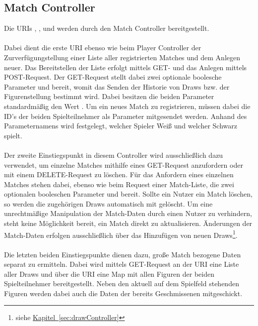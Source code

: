 \subsection{Match Controller}\label{sec:matchController}
Die \glspl{URI} , ,  und  werden durch den Match Controller bereitgestellt.\\
\\
Dabei dient die erste \gls{URI} ebenso wie beim Player Controller der Zurverfügungstellung einer Liste aller registrierten Matches und dem Anlegen neuer. Das Bereitstellen der Liste erfolgt mittels GET- und das Anlegen mittels POST-Request. Der GET-Request stellt dabei zwei optionale boolesche Parameter  und  bereit, womit das Senden der Historie von Draws bzw. der Figurenstellung bestimmt wird. Dabei besitzen die beiden Parameter standardmäßig den Wert . Um ein neues Match zu registrieren, müssen dabei die ID's der beiden Spielteilnehmer als Parameter mitgesendet werden. Anhand des Parameternamens wird festgelegt, welcher Spieler Weiß und welcher Schwarz spielt.\\
\\
Der zweite Einstiegspunkt in diesem Controller wird ausschließlich dazu verwendet, um einzelne Matches mithilfe eines GET-Request anzufordern oder mit einem DELETE-Request zu löschen. Für das Anfordern eines einzelnen Matches stehen dabei, ebenso wie beim Request einer Match-Liste, die zwei optionalen booleschen Parameter  und  bereit. Sollte ein Nutzer ein Match löschen, so werden die zugehörigen Draws automatisch mit gelöscht. Um eine unrechtmäßige Manipulation der Match-Daten durch einen Nutzer zu verhindern, steht keine Möglichkeit bereit, ein Match direkt zu aktualisieren. Änderungen der Match-Daten erfolgen ausschließlich über das Hinzufügen von neuen Draws\footnote{siehe \hyperref[sec:drawController]{Kapitel~\ref{sec:drawController}}}.\\
\\
Die letzten beiden Einstiegspunkte dienen dazu, große Match bezogene Daten separat zu ermitteln. Dabei wird mittels GET-Request an der \gls{URI}  eine Liste aller Draws und über die \gls{URI}  eine Map mit allen Figuren der beiden Spielteilnehmer bereitgestellt. Neben den aktuell auf dem Spielfeld stehenden Figuren werden dabei auch die Daten der bereits Geschmissenen mitgeschickt.\\
